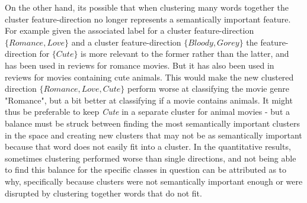 On the other hand, its possible that when clustering many words together the cluster feature-direction no longer represents a semantically important feature. For example given the associated label for a cluster feature-direction $\{Romance, Love\}$ and a cluster feature-direction $\{Bloody, Gorey\}$ the feature-direction for $\{Cute\}$ is more relevant to the former rather than the latter, and  has been used in reviews for romance movies. But it has also been used in reviews for movies containing cute animals. This would make the new clustered direction $\{Romance, Love, Cute\}$ perform worse at classifying the movie genre "Romance", but a bit better at classifying if a movie contains animals. It might thus be preferable to keep \textit{Cute} in a separate cluster for animal movies - but a balance must be struck between finding the most semantically important clusters in the space and creating new clusters that may not be as semantically important because that word does not easily fit into a cluster. In the quantitative results, sometimes clustering performed worse than single directions, and not being able to find this balance for the specific classes in question can be attributed as to why, specifically because clusters were not semantically important enough or were disrupted by clustering together words that do not fit.






